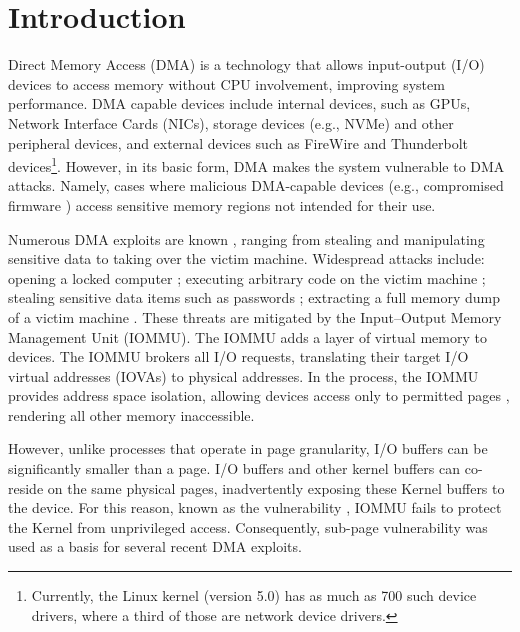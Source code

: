 \section{Introduction}

Direct Memory Access (DMA) is a technology that allows input-output (I/O) devices to access memory without CPU involvement, improving system performance.
DMA capable devices include internal devices, such as GPUs, Network Interface Cards (NICs), storage devices (e.g., NVMe) and other peripheral devices, and external devices such as FireWire and Thunderbolt devices\footnote{Currently, the Linux kernel (version 5.0) has as much as 700 such device drivers, where a third of those are network device drivers.}. However, in its basic form, DMA makes the system vulnerable to DMA attacks. Namely, cases where malicious DMA-capable devices (e.g., compromised firmware \cite{Gal14,Ben17a}) access sensitive memory regions not intended for their use. 


Numerous DMA exploits are known \cite{Dor04,BDK10,thunder}, ranging from stealing and manipulating sensitive data to taking over the victim machine. Widespread attacks include: opening a locked computer \cite{MM, Fin14}; executing arbitrary code on the victim machine \cite{Fri16, Woj08, AD10,thunder}; stealing sensitive data items such as passwords \cite{SB12, LKV13, Cim16, BR12}; extracting a full memory dump of a victim machine \cite{MM, Vol, Fin14, GA10}. These threats are mitigated by the Input–Output Memory Management Unit (IOMMU). The IOMMU adds a layer of virtual memory to devices. The IOMMU brokers all I/O requests, translating their target I/O virtual addresses (IOVAs) to physical addresses. In the process, the IOMMU provides address space isolation, allowing devices access only to permitted pages
, rendering all other memory inaccessible.

However, unlike processes that operate in page granularity, I/O buffers can be significantly smaller than a page. I/O buffers and other kernel buffers can co-reside on the same physical pages, inadvertently exposing these Kernel buffers to the device. For this reason, known as the \subpage{} vulnerability \cite{MMT16,thunder}, IOMMU fails to protect the Kernel from unprivileged access. Consequently, sub-page vulnerability was used as a basis for several recent DMA exploits. 

